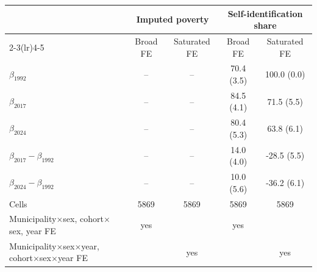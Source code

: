 \begin{tabular}{lcccc}
\toprule
 & \multicolumn{2}{c}{Imputed poverty} & \multicolumn{2}{c}{Self-identification share} \\
\cmidrule(lr){2-3}\cmidrule(lr){4-5}
 & Broad FE & Saturated FE & Broad FE & Saturated FE \\
\midrule
$\beta_{1992}$ & -- & -- & 70.4 (3.5) & 100.0 (0.0) \\
$\beta_{2017}$ & -- & -- & 84.5 (4.1) & 71.5 (5.5) \\
$\beta_{2024}$ & -- & -- & 80.4 (5.3) & 63.8 (6.1) \\
\midrule
$\beta_{2017}-\beta_{1992}$ & -- & -- & 14.0 (4.0) & -28.5 (5.5) \\
$\beta_{2024}-\beta_{1992}$ & -- & -- & 10.0 (5.6) & -36.2 (6.1) \\
\midrule
Cells & 5869 & 5869 & 5869 & 5869 \\
Municipality$\times$sex, cohort$\times$sex, year FE & yes & & yes & \\
Municipality$\times$sex$\times$year, cohort$\times$sex$\times$year FE & & yes & & yes \\
\bottomrule
\end{tabular}
